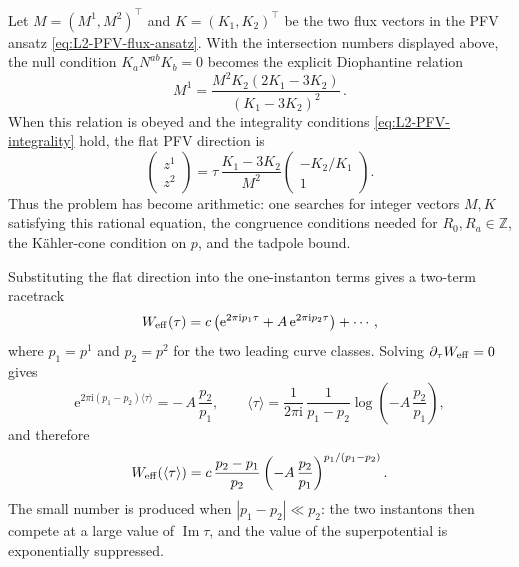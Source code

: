 \begin{example}
Let $M=(M^1,M^2)^{\top}$ and $K=(K_1,K_2)^{\top}$ be the two flux
vectors in the PFV ansatz \eqref{eq:L2-PFV-flux-ansatz}.  With the
intersection numbers displayed above, the null condition
$K_aN^{ab}K_b=0$ becomes the explicit Diophantine relation
\begin{equation}
    M^1
    =
    \frac{M^2K_2(2K_1-3K_2)}
         {(K_1-3K_2)^2}\, .
\end{equation}
When this relation is obeyed and the integrality conditions
\eqref{eq:L2-PFV-integrality} hold, the flat PFV direction is
\begin{equation}
    \begin{pmatrix}
        z^1\\
        z^2
    \end{pmatrix}
    =
    \tau\,
    \frac{K_1-3K_2}{M^2}
    \begin{pmatrix}
        -K_2/K_1\\
        1
    \end{pmatrix}.
\end{equation}
Thus the problem has become arithmetic: one searches for integer
vectors $M,K$ satisfying this rational equation, the congruence
conditions needed for $R_0,R_a\in\mathbb Z$, the K\"ahler-cone
condition on $p$, and the tadpole bound.

Substituting the flat direction into the one-instanton terms gives a
two-term racetrack
\begin{equation}
    W_{\rm eff}(\tau)
    =
    c\left(
      \mathrm{e}^{2\pi\mathrm{i}p_1\tau}
      +A\,\mathrm{e}^{2\pi\mathrm{i}p_2\tau}
    \right)+\cdots ,
\end{equation}
where $p_1=p^1$ and $p_2=p^2$ for the two leading curve classes.
Solving $\partial_\tau W_{\rm eff}=0$ gives
\begin{equation}
    \mathrm{e}^{2\pi\mathrm{i}(p_1-p_2)\langle\tau\rangle}
    =
    -\,A\,\frac{p_2}{p_1},
    \qquad
    \langle\tau\rangle
    =
    \frac{1}{2\pi\mathrm{i}}\,
    \frac{1}{p_1-p_2}
    \log\!\left(-A\,\frac{p_2}{p_1}\right),
\end{equation}
and therefore
\begin{equation}
    W_{\rm eff}(\langle\tau\rangle)
    =
    c\,\frac{p_2-p_1}{p_2}
    \left(-A\,\frac{p_2}{p_1}\right)^{p_1/(p_1-p_2)}.
\end{equation}
The small number is produced when $|p_1-p_2|\ll p_2$: the two
instantons then compete at a large value of $\operatorname{Im}\tau$,
and the value of the superpotential is exponentially suppressed.


\end{example}
